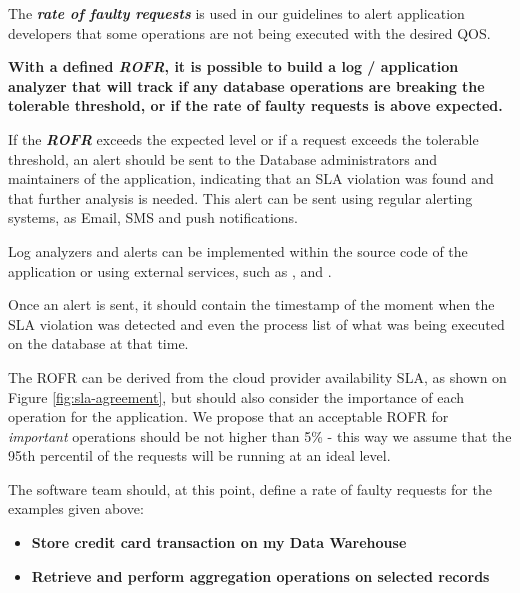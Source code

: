The \textbf{\textit{rate of faulty requests}} is used in our guidelines to alert application developers that some operations are not being executed with the desired QOS.

\textbf{With a defined \textbf{\textit{ROFR}}, it is possible to build a log / application analyzer that will track if any database operations are breaking the tolerable threshold, or if the rate of faulty requests is above expected.}

If the \textbf{\textit{ROFR}} exceeds the expected level or if a request exceeds the tolerable threshold, an alert should be sent to the Database administrators and maintainers of the application, indicating that an SLA violation was found and that further analysis is needed. This alert can be sent using regular alerting systems, as Email, SMS and push notifications.

Log analyzers and alerts can be implemented within the source code of the application or using external services, such as \cite{logstash}, \cite{papertrail} and \cite{newrelic}. 

Once an alert is sent, it should contain the timestamp of the moment when the SLA violation was detected and even the process list of what was being executed on the database at that time.

The ROFR can be derived from the cloud provider availability SLA, as shown on Figure \ref{fig:sla-agreement}, but should also consider the importance of each operation for the application. We propose that an acceptable ROFR for \textit{important} operations should be not higher than 5\% - this way we assume that the 95th percentil of the requests will be running at an ideal level. 

The software team should, at this point, define a rate of faulty requests for the examples given above: 

\begin{itemize}
\item{ 
\textbf{Store credit card transaction on my Data Warehouse}
}

\item{
\textbf{Retrieve and perform aggregation operations on selected records}
}
\end{itemize}

